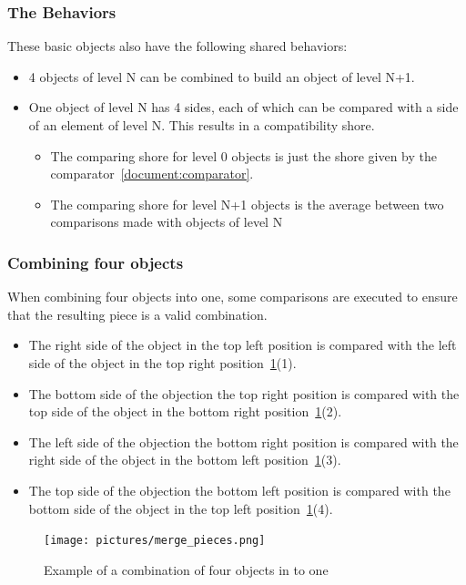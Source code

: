 \documentclass{article}
\begin{document}
\subsubsection{The Behaviors}

These basic objects also have the following shared behaviors:
\begin{itemize}
  \item 4 objects of level N can be combined to build an object of level N+1.
  \item One object of level N has 4 sides, each of which can be compared with a side of an element of level N. This results in a compatibility shore.
  \begin{itemize}
    \item The comparing shore for level 0 objects is just the shore given by the comparator~\ref{document:comparator}.
    \item The comparing shore for level N+1 objects is the average between two comparisons made with objects of level N
  \end{itemize}
\end{itemize}

\subsubsection{Combining four objects}

When combining four objects into one, some comparisons are executed to ensure that the resulting piece is a valid  combination.
\begin{itemize}
  \item The right side of the object in the top left position is compared with the left side of the object in the top right position~\ref{fig:merge_pieces}(1).
  \item The bottom side of the objection the top right position is compared with the top side of the object in the bottom right position~\ref{fig:merge_pieces}(2).
  \item The left side of the objection the bottom right position is compared with the right side of the object in the bottom left position~\ref{fig:merge_pieces}(3).
  \item The top side of the objection the bottom left position is compared with the bottom side of the object in the top left position~\ref{fig:merge_pieces}(4).
\end{itemize}

\begin{figure}[H]
  \caption{Example of a combination of four objects in to one}\label{fig:merge_pieces}
  \centering
  \texttt{[image: pictures/merge\_pieces.png]}
\end{figure}
\end{document}
